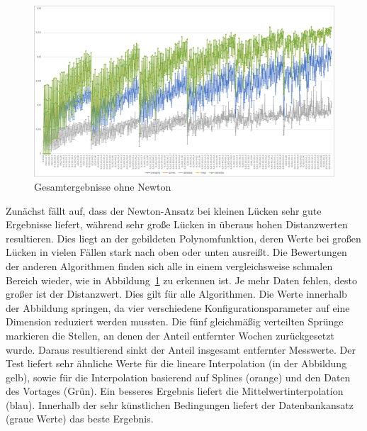 \begin{figure}[!t]
	\begin{center}
		\includegraphics[width=0.9\columnwidth]{pics/evaluation-algorithms}
	\end{center}
	\caption{\label{fig:evaluation_algorithms}Gesamtergebnisse ohne Newton}
\end{figure}

Zunächst fällt auf, dass der Newton-Ansatz bei kleinen Lücken sehr gute Ergebnisse liefert, während sehr große Lücken in überaus hohen Distanzwerten resultieren. Dies liegt an der gebildeten Polynomfunktion, deren Werte bei großen Lücken in vielen Fällen stark nach oben oder unten ausreißt.
Die Bewertungen der anderen Algorithmen finden sich alle in einem vergleichsweise schmalen Bereich wieder, wie in Abbildung~\ref{fig:evaluation_algorithms} zu erkennen ist. Je mehr Daten fehlen, desto großer ist der Distanzwert. Dies gilt für alle Algorithmen. Die Werte innerhalb der Abbildung springen, da vier verschiedene Konfigurationsparameter auf eine Dimension reduziert werden mussten. Die fünf gleichmäßig verteilten Sprünge markieren die Stellen, an denen der Anteil entfernter Wochen zurückgesetzt wurde. Daraus resultierend sinkt der Anteil insgesamt entfernter Messwerte.
Der Test liefert sehr ähnliche Werte für die lineare Interpolation (in der Abbildung gelb), sowie für die Interpolation basierend auf Splines (orange) und den Daten des Vortages (Grün). Ein besseres Ergebnis liefert die Mittelwertinterpolation (blau). Innerhalb der sehr künstlichen Bedingungen liefert der Datenbankansatz (graue Werte) das beste Ergebnis.

